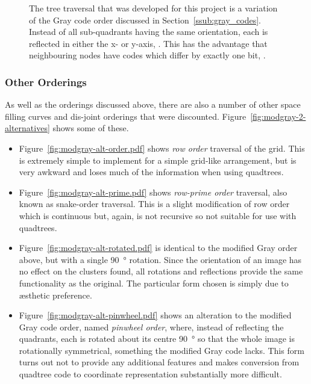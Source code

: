\begin{figure}[tbh]
	\caption[Modified Gray Code ordering]{The tree traversal that was developed
		for this project is a variation of the Gray code order discussed in
		Section~\ref{ssub:gray_codes}.  Instead of all sub-quadrants having the
		same orientation, each is reflected in either the x- or y-axis,
		. This has the advantage that
		neighbouring nodes have codes which differ by exactly one bit,
		.}\label{fig:modgray-traversal}
\end{figure}


\subsubsection{Other Orderings}
\label{ssub:other_orderings}

As well as the orderings discussed above, there are also a number of other
space filling curves and dis-joint orderings that were discounted.
Figure~\ref{fig:modgray-2-alternatives} shows some of these.

\begin{itemize}

	\item Figure~\ref{fig:modgray-alt-order.pdf} shows \emph{row order}
		traversal of the grid. This is extremely simple to implement for a
		simple grid-like arrangement, but is very awkward and loses much of the
		information when using quadtrees.

	\item Figure~\ref{fig:modgray-alt-prime.pdf} shows \emph{row-prime order}
		traversal, also known as snake-order\cite{goodchild1983optimizing}
		traversal.  This is a slight modification of row order which is
		continuous but, again, is not recursive so not suitable for use with
		quadtrees.

	\item Figure~\ref{fig:modgray-alt-rotated.pdf} is identical to the
		modified Gray order above, but with a single \SI{90}{\degree} rotation.
		Since the orientation of an image has no effect on the clusters found,
		all rotations and reflections provide the same functionality as the
		original. The particular form chosen is simply due to {\ae}sthetic
		preference.

	\item Figure~\ref{fig:modgray-alt-pinwheel.pdf} shows an alteration to the
		modified Gray code order, named \emph{pinwheel order}, where, instead
		of reflecting the quadrants, each is rotated about its centre
		\SI{90}{\degree} so that the whole image is rotationally symmetrical,
		something the modified Gray code lacks.  This form turns out not to
		provide any additional features and makes conversion from quadtree code
		to coordinate representation substantially more difficult.

\end{itemize}

